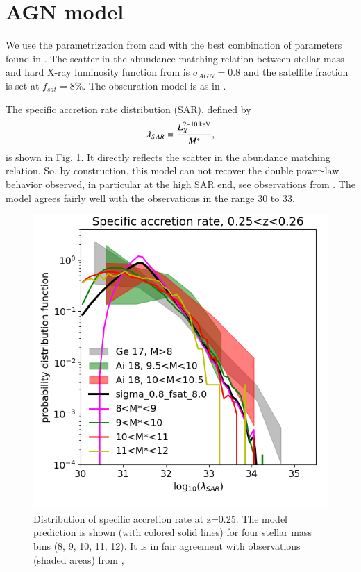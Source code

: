 \documentclass[twocolumn,iop]{openjournal}
\begin{document}
\clearpage
\section{AGN model}

We use the parametrization from \citet{ComparatMerloniSalvato_2019MNRAS.487.2005C} and \citet{LiuMerloniComparat_2022A&A...661A..27L} with the best combination of parameters found in \citet{ComparatLuoMerloni_2023A&A...673A.122C}. 
The scatter in the abundance matching relation between stellar mass and hard X-ray luminosity function from \citet{AirdCoilGeorgakakis_2015MNRAS.451.1892A} is $\sigma_{AGN}=0.8$ and the satellite fraction is set at $f_{sat}=8\%$. 
The obscuration model is as in \citet{ComparatMerloniSalvato_2019MNRAS.487.2005C}. 

The specific accretion rate distribution (SAR), defined by
\begin{equation}
\lambda_{SAR}=\frac{L^{\rm 2-10\; keV}_X}{M^*},    
\end{equation}
is shown in Fig. \ref{fig:AGN:LSAR}. 
It directly reflects the scatter in the abundance matching relation. 
So, by construction, this model can not recover the double power-law behavior observed, in particular at the high SAR end, see observations from \citet{GeorgakakisAirdSchulze_2017MNRAS.471.1976G, AirdCoilGeorgakakis2018MNRAS.474.1225A}. 
The model agrees fairly well with the observations in the range 30 to 33.

\begin{figure}
    \centering
    \includegraphics[width=0.95\linewidth]{figures_AGN/LSAR_z025.png}
    \caption{Distribution of specific accretion rate at z=0.25. 
    The model prediction is shown (with colored solid lines) for four stellar mass bins (8, 9, 10, 11, 12).
    It is in fair agreement with observations (shaded areas) from \citet[][Ge17]{GeorgakakisAirdSchulze_2017MNRAS.471.1976G}, \citet[][Ai18]{AirdCoilGeorgakakis2018MNRAS.474.1225A}
    }
    \label{fig:AGN:LSAR}
\end{figure}
\end{document}
